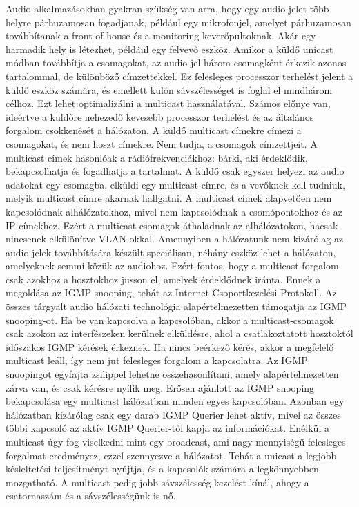 Audio alkalmazásokban gyakran szükség van arra, hogy egy audio jelet
több helyre párhuzamosan fogadjanak, például egy mikrofonjel, amelyet
párhuzamosan továbbítanak a front-of-house és a monitoring keverőpultoknak. Akár
egy harmadik hely is létezhet, például egy felvevő eszköz. 
Amikor a küldő unicast módban továbbítja a csomagokat, az audio jel három csomagként
érkezik azonos tartalommal, de különböző címzettekkel. Ez felesleges
processzor terhelést jelent a küldő eszköz számára, és emellett külön sávszélességet is
foglal el mindhárom célhoz. Ezt lehet optimalizálni a multicast használatával. 
Számos előnye van, ideértve a küldőre nehezedő kevesebb processzor terhelést 
és az általános forgalom csökkenését a hálózaton. 
A küldő multicast címekre címezi a csomagokat, és nem hoszt címekre. Nem tudja, a csomagok címzettjeit. 
A multicast címek hasonlóak a rádiófrekvenciákhoz: bárki, aki érdeklődik, bekapcsolhatja és fogadhatja a
tartalmat. A küldő csak egyszer helyezi az audio adatokat egy csomagba, elküldi
egy multicast címre, és a vevőknek kell tudniuk, melyik multicast címre akarnak
hallgatni. A multicast címek alapvetően nem kapcsolódnak alhálózatokhoz, mivel nem
kapcsolódnak a csomópontokhoz és az IP-címekhez. Ezért a multicast csomagok
áthaladnak az alhálózatokon, hacsak nincsenek elkülönítve VLAN-okkal. 
Amennyiben a hálózatunk nem kizárólag az audio jelek továbbítására 
készült speciálisan, néhány eszköz lehet a hálózaton, amelyeknek semmi közük az audiohoz.
Ezért fontos, hogy a multicast forgalom csak
azokhoz a hosztokhoz jusson el, amelyek érdeklődnek iránta. 
Ennek a megoldása az IGMP snooping, tehát az Internet Csoportkezelési Protokoll. 
Az összes tárgyalt audio hálózati technológia alapértelmezetten
támogatja az IGMP snooping-ot. Ha be van kapcsolva a kapcsolóban, akkor a
multicast-csomagok csak azokon az interfészeken kerülnek elküldésre, ahol a
csatlakoztatott hosztoktól időszakos IGMP kérések érkeznek. Ha nincs beérkező
kérés, akkor a megfelelő multicast leáll, így nem jut felesleges forgalom a
kapcsolatra. Az IGMP snoopingot egyfajta zsilippel lehetne összehasonlítani,
amely alapértelmezetten zárva van, és csak kérésre nyílik meg. Erősen ajánlott
az IGMP snooping bekapcsolása egy multicast hálózatban minden egyes kapcsolóban.
Azonban egy hálózatban kizárólag csak egy darab IGMP Querier lehet aktív, mivel az
összes többi kapcsoló az aktív IGMP Querier-től kapja az információkat.
Enélkül a multicast úgy fog viselkedni mint egy broadcast, ami nagy mennyiségű
felesleges forgalmat eredményez, ezzel szennyezve a hálózatot.
Tehát a unicast a legjobb késleltetési teljesítményt nyújtja, és a
kapcsolók számára a legkönnyebben mozgatható.
A multicast pedig jobb sávszélesség-kezelést kínál, ahogy a csatornaszám és a sávszélességünk is nő.

